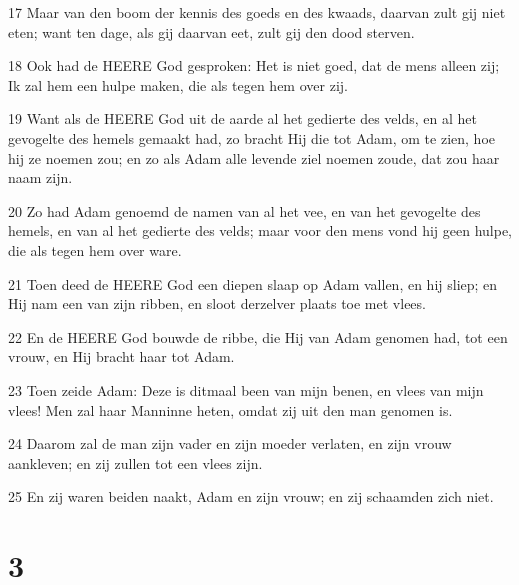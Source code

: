 \par 17 Maar van den boom der kennis des goeds en des kwaads, daarvan zult gij niet eten; want ten dage, als gij daarvan eet, zult gij den dood sterven.
\par 18 Ook had de HEERE God gesproken: Het is niet goed, dat de mens alleen zij; Ik zal hem een hulpe maken, die als tegen hem over zij.
\par 19 Want als de HEERE God uit de aarde al het gedierte des velds, en al het gevogelte des hemels gemaakt had, zo bracht Hij die tot Adam, om te zien, hoe hij ze noemen zou; en zo als Adam alle levende ziel noemen zoude, dat zou haar naam zijn.
\par 20 Zo had Adam genoemd de namen van al het vee, en van het gevogelte des hemels, en van al het gedierte des velds; maar voor den mens vond hij geen hulpe, die als tegen hem over ware.
\par 21 Toen deed de HEERE God een diepen slaap op Adam vallen, en hij sliep; en Hij nam een van zijn ribben, en sloot derzelver plaats toe met vlees.
\par 22 En de HEERE God bouwde de ribbe, die Hij van Adam genomen had, tot een vrouw, en Hij bracht haar tot Adam.
\par 23 Toen zeide Adam: Deze is ditmaal been van mijn benen, en vlees van mijn vlees! Men zal haar Manninne heten, omdat zij uit den man genomen is.
\par 24 Daarom zal de man zijn vader en zijn moeder verlaten, en zijn vrouw aankleven; en zij zullen tot een vlees zijn.
\par 25 En zij waren beiden naakt, Adam en zijn vrouw; en zij schaamden zich niet.

\chapter{3}

